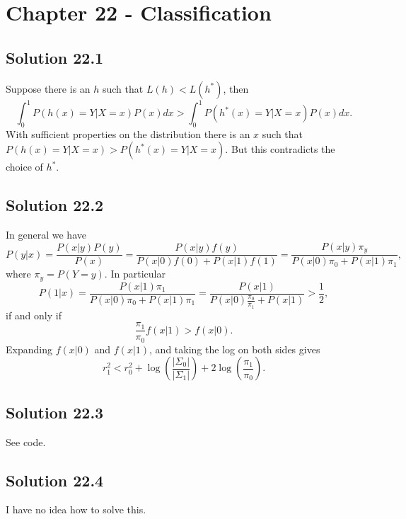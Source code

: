 \section*{Chapter 22 - Classification}

\subsection*{Solution 22.1}

Suppose there is an $h$ such that $L(h) < L(h^*)$, then
\begin{equation*}
    \int_0^1 P(h(x) = Y | X = x) P(x) dx > \int_0^1 P(h^*(x) = Y | X = x) P(x) dx.
\end{equation*}
With sufficient properties on the distribution there is an $x$ such that $P(h(x) = Y | X = x) > P(h^*(x) = Y | X = x)$.
But this contradicts the choice of $h^*$.


\subsection*{Solution 22.2}

In general we have
\begin{equation*}
    P(y|x) = \frac{P(x|y)P(y)}{P(x)}
        = \frac{P(x|y)f(y)}{P(x|0)f(0) + P(x|1)f(1)}
        = \frac{P(x|y) \pi_y}{P(x|0) \pi_0 + P(x|1) \pi_1},
\end{equation*}
where $\pi_y = P(Y = y)$.
In particular
\begin{equation*}
    P(1|x) = \frac{P(x|1) \pi_1}{P(x|0) \pi_0 + P(x|1) \pi_1}
        = \frac{P(x|1)}{P(x|0) \frac{\pi_0}{\pi_1} + P(x|1)}
        > \frac{1}{2},
\end{equation*}
if and only if
\begin{equation*}
    \frac{\pi_1}{\pi_0} f(x|1) > f(x|0).
\end{equation*}
Expanding $f(x|0)$ and $f(x|1)$, and taking the log on both sides gives
\begin{equation*}
    r_1^2 < r_0^2 + \log\left(\frac{|\Sigma_0|}{|\Sigma_1|}\right) + 2\log\left(\frac{\pi_1}{\pi_0}\right).
\end{equation*}


\subsection*{Solution 22.3}

See code.


\subsection*{Solution 22.4}

I have no idea how to solve this.
